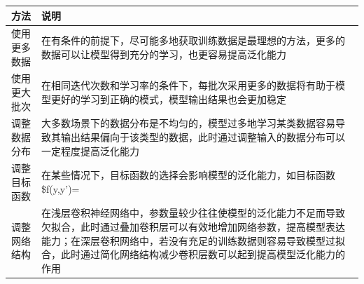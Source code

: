 \begin{longtable}[]{@{}cl@{}}
\toprule
\begin{minipage}[b]{0.08\columnwidth}\centering\strut
方法\strut
\end{minipage} & \begin{minipage}[b]{0.07\columnwidth}\raggedright\strut
说明\strut
\end{minipage}\tabularnewline
\midrule
\endhead
\begin{minipage}[t]{0.08\columnwidth}\centering\strut
使用更多数据\strut
\end{minipage} & \begin{minipage}[t]{0.07\columnwidth}\raggedright\strut
在有条件的前提下，尽可能多地获取训练数据是最理想的方法，更多的数据可以让模型得到充分的学习，也更容易提高泛化能力\strut
\end{minipage}\tabularnewline
\begin{minipage}[t]{0.08\columnwidth}\centering\strut
使用更大批次\strut
\end{minipage} & \begin{minipage}[t]{0.07\columnwidth}\raggedright\strut
在相同迭代次数和学习率的条件下，每批次采用更多的数据将有助于模型更好的学习到正确的模式，模型输出结果也会更加稳定\strut
\end{minipage}\tabularnewline
\begin{minipage}[t]{0.08\columnwidth}\centering\strut
调整数据分布\strut
\end{minipage} & \begin{minipage}[t]{0.07\columnwidth}\raggedright\strut
大多数场景下的数据分布是不均匀的，模型过多地学习某类数据容易导致其输出结果偏向于该类型的数据，此时通过调整输入的数据分布可以一定程度提高泛化能力\strut
\end{minipage}\tabularnewline
\begin{minipage}[t]{0.08\columnwidth}\centering\strut
调整目标函数\strut
\end{minipage} & \begin{minipage}[t]{0.07\columnwidth}\raggedright\strut
在某些情况下，目标函数的选择会影响模型的泛化能力，如目标函数\$f(y,y')=\strut
\end{minipage}\tabularnewline
\begin{minipage}[t]{0.08\columnwidth}\centering\strut
调整网络结构\strut
\end{minipage} & \begin{minipage}[t]{0.07\columnwidth}\raggedright\strut
在浅层卷积神经网络中，参数量较少往往使模型的泛化能力不足而导致欠拟合，此时通过叠加卷积层可以有效地增加网络参数，提高模型表达能力；在深层卷积网络中，若没有充足的训练数据则容易导致模型过拟合，此时通过简化网络结构减少卷积层数可以起到提高模型泛化能力的作用\strut

\end{minipage}
\end{longtable}
